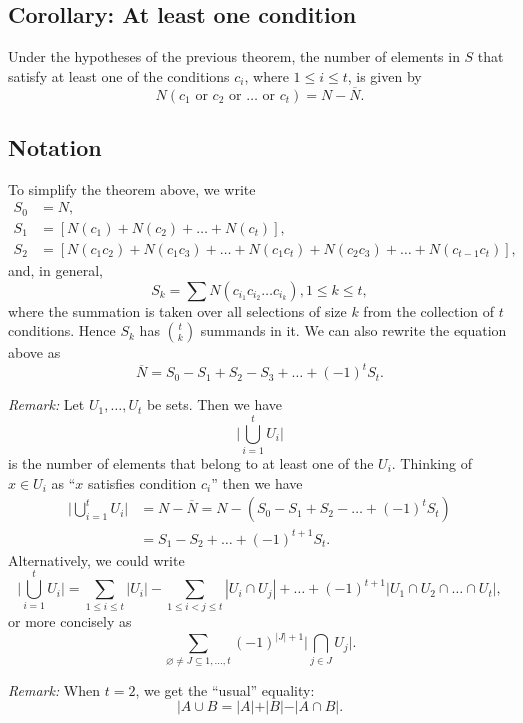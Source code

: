 \documentclass[11pt]{article}
\let\emptyset\varnothing
\begin{document}
    \subsection{Corollary: At least one condition}

    Under the hypotheses of the previous theorem, the number of elements in $S$ that satisfy at least one of the conditions \(c_i\), where \(1 \leq i \leq t\), is given by \[N(c_1 \text{ or } c_2 \text{ or } \dots \text{ or } c_t) = N - \overline{N}.\]

    \subsection{Notation}

    To simplify the theorem above, we write 
    \begin{align*}
        S_0 &= N, \\
        S_1 &= [N(c_1) + N(c_2) + \dots + N(c_t)], \\
        S_2 &= [N(c_1 c_2) + N(c_1 c_3) + \dots + N(c_1 c_t) + N(c_2 c_3) + \dots + N(c_{t-1} c_t)],
    \end{align*}
    and, in general, \[S_k = \sum N(c_{i_1} c_{i_2} \dots c_{i_k}), 1 \leq k \leq t,\] where the summation is taken over all selections of size $k$ from the collection of $t$ conditions. Hence \(S_k\) has \(\binom{t}{k}\) summands in it. We can also rewrite the equation above as \[\overline{N} = S_0 - S_1 + S_2 - S_3 + \dots + (-1)^t S_t.\]

    \emph{Remark:} Let \(U_1, \dots, U_t\) be sets. Then we have \[\bigg| \bigcup_{i=1}^{t} U_i \bigg|\] is the number of elements that belong to at least one of the \(U_i\). Thinking of \(x \in U_i\) as ``$x$ satisfies condition \(c_i\)'' then we have
    \begin{align*}
        \bigg| \bigcup_{i=1}^{t} U_i \bigg| &= N - \overline{N} = N - (S_0 - S_1 + S_2 - \dots + (-1)^t S_t) \\ 
        &= S_1 - S_2 + \dots + (-1)^{t+1} S_t.
    \end{align*}
    Alternatively, we could write \[\bigg| \bigcup_{i=1}^{t} U_i \bigg| = \sum_{1 \leq i \leq t} | U_i | - \sum_{1 \leq i < j \leq t} |U_i \cap U_j| + \dots + (-1)^{t+1} |U_1 \cap U_2 \cap \dots \cap U_t|,\] or more concisely as \[\sum_{\emptyset \neq J \subseteq{1, \dots, t}} (-1)^{|J| + 1} \bigg| \bigcap_{j \in J} U_j \bigg|.\]

    \emph{Remark:} When \(t = 2\), we get the ``usual'' equality: \[| A \cup B = |A| + |B| - |A \cap B|.\]
\end{document}
